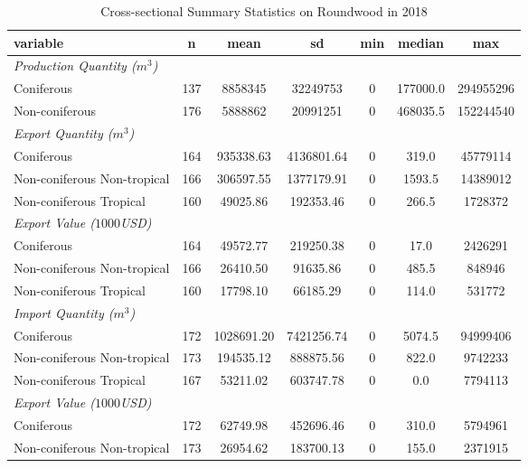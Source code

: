 \documentclass[a4paper,12pt]{article}
\begin{document}
\begin{table}[htbp]
    \caption{Cross-sectional Summary Statistics on Roundwood in 2018}
    \centering
    \begin{tabular}{lcccccc}
        \tabularnewline \midrule \midrule
        variable & n & mean & sd & min & median & max\\
        \midrule
        \emph{Production Quantity ($m^3$)}\\
        Coniferous & 137 & 8858345 & 32249753 & 0 & 177000.0 & 294955296\\
        
        Non-coniferous & 176 & 5888862 & 20991251 & 0 & 468035.5 & 152244540\\
        
        \midrule
        \emph{Export Quantity ($m^3$)}\\
Coniferous & 164 & 935338.63 & 4136801.64 & 0 & 319.0 & 45779114\\

Non-coniferous Non-tropical & 166 & 306597.55 & 1377179.91 & 0 & 1593.5 & 14389012\\

Non-coniferous Tropical & 160 & 49025.86 & 192353.46 & 0 & 266.5 & 1728372\\
\midrule
\emph{Export Value ($1000$USD)}\\
Coniferous & 164 & 49572.77 & 219250.38 & 0 & 17.0 & 2426291\\

Non-coniferous Non-tropical & 166 & 26410.50 & 91635.86 & 0 & 485.5 & 848946\\

Non-coniferous Tropical & 160 & 17798.10 & 66185.29 & 0 & 114.0 & 531772\\
\midrule
\emph{Import Quantity ($m^3$)}\\
Coniferous & 172 & 1028691.20 & 7421256.74 & 0 & 5074.5 & 94999406\\

Non-coniferous Non-tropical & 173 & 194535.12 & 888875.56 & 0 & 822.0 & 9742233\\

Non-coniferous Tropical & 167 & 53211.02 & 603747.78 & 0 & 0.0 & 7794113\\
\midrule
\emph{Export Value ($1000$USD)}\\
Coniferous & 172 & 62749.98 & 452696.46 & 0 & 310.0 & 5794961\\

Non-coniferous Non-tropical & 173 & 26954.62 & 183700.13 & 0 & 155.0 & 2371915\\


\end{tabular}
\end{table}
\end{document}
